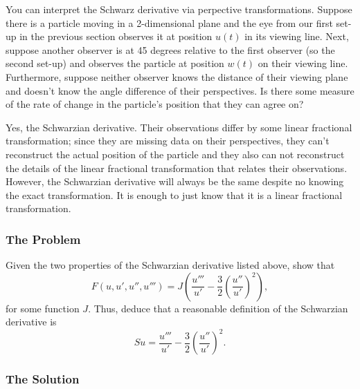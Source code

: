 You can interpret the Schwarz derivative via perpective transformations. Suppose there is a particle moving in a
2-dimensional plane and the eye from our first set-up in the previous section observes it at position \(u(t)\)
in its viewing line. Next, suppose another observer is at 45 degrees relative to the first observer (so the 
second set-up) and observes the particle at position \(w(t)\) on their viewing line. Furthermore, suppose
neither observer knows the distance of their viewing plane and doesn't know the angle difference of
their perspectives. Is there some measure of the rate of change in the particle's position that they can agree on?

Yes, the Schwarzian derivative. Their observations differ by some linear fractional transformation; 
since they are missing data on their perspectives, they can't reconstruct the actual position of the particle
and they also can not reconstruct the details of the linear fractional transformation that relates their observations.
However, the Schwarzian derivative will always be the same despite no knowing the exact transformation. It is
enough to just know that it is a linear fractional transformation. 

\subsubsection*{The Problem}

Given the two properties of the Schwarzian derivative listed above, show that
\begin{equation}
F(u, u', u'', u''') = J\left( \frac{u'''}{u'} - \frac{3}{2} \left(\frac{u''}{u'}\right)^2 \right),
\end{equation}
for some function \(J\). Thus, deduce that a reasonable definition of the Schwarzian derivative is
\begin{equation}
Su = \frac{u'''}{u'} - \frac{3}{2}\left( \frac{u''}{u'} \right)^2.
\end{equation} 

\subsubsection*{The Solution}

